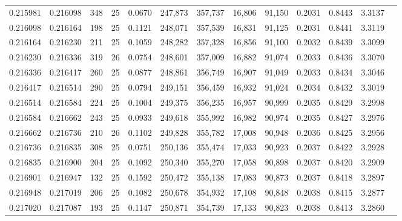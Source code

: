 \begin{tabular}{rrrrrrrrrrrrr}
0.215981 & 0.216098 &   348 &  25 &                                     0.0670 & 247,873 & 357,737 &  16,806 &  91,150 & 0.2031 & 0.8443 & 3.3137 \\
0.216098 & 0.216164 &   198 &  25 &                                     0.1121 & 248,071 & 357,539 &  16,831 &  91,125 & 0.2031 & 0.8441 & 3.3119 \\
0.216164 & 0.216230 &   211 &  25 &                                     0.1059 & 248,282 & 357,328 &  16,856 &  91,100 & 0.2032 & 0.8439 & 3.3099 \\
0.216230 & 0.216336 &   319 &  26 &                                     0.0754 & 248,601 & 357,009 &  16,882 &  91,074 & 0.2033 & 0.8436 & 3.3070 \\
0.216336 & 0.216417 &   260 &  25 &                                     0.0877 & 248,861 & 356,749 &  16,907 &  91,049 & 0.2033 & 0.8434 & 3.3046 \\
0.216417 & 0.216514 &   290 &  25 &                                     0.0794 & 249,151 & 356,459 &  16,932 &  91,024 & 0.2034 & 0.8432 & 3.3019 \\
0.216514 & 0.216584 &   224 &  25 &                                     0.1004 & 249,375 & 356,235 &  16,957 &  90,999 & 0.2035 & 0.8429 & 3.2998 \\
0.216584 & 0.216662 &   243 &  25 &                                     0.0933 & 249,618 & 355,992 &  16,982 &  90,974 & 0.2035 & 0.8427 & 3.2976 \\
0.216662 & 0.216736 &   210 &  26 &                                     0.1102 & 249,828 & 355,782 &  17,008 &  90,948 & 0.2036 & 0.8425 & 3.2956 \\
0.216736 & 0.216835 &   308 &  25 &                                     0.0751 & 250,136 & 355,474 &  17,033 &  90,923 & 0.2037 & 0.8422 & 3.2928 \\
0.216835 & 0.216900 &   204 &  25 &                                     0.1092 & 250,340 & 355,270 &  17,058 &  90,898 & 0.2037 & 0.8420 & 3.2909 \\
0.216901 & 0.216947 &   132 &  25 &                                     0.1592 & 250,472 & 355,138 &  17,083 &  90,873 & 0.2037 & 0.8418 & 3.2897 \\
0.216948 & 0.217019 &   206 &  25 &                                     0.1082 & 250,678 & 354,932 &  17,108 &  90,848 & 0.2038 & 0.8415 & 3.2877 \\
0.217020 & 0.217087 &   193 &  25 &                                     0.1147 & 250,871 & 354,739 &  17,133 &  90,823 & 0.2038 & 0.8413 & 3.2860 \\

\end{tabular}
